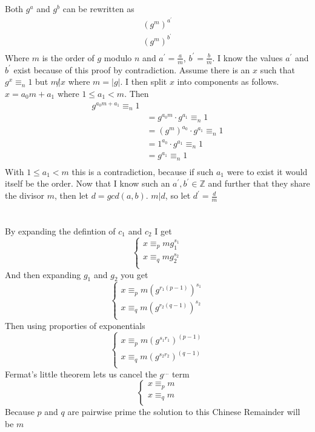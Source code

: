\documentclass{article}
\begin{document}
\section{}
Both $g^{a}$ and $g^{b}$ can be rewritten as 
\[
\begin{split}
(g^{m})^{a^{\prime}} \\
(g^{m})^{b^{\prime}} \\
\end{split}
\]
Where $m$ is the order of $g$ modulo $n$ and
$a^{\prime} = \frac{a}{m}$, 
$b^{\prime} = \frac{b}{m}$.
\newline
I know the values $a^{\prime}$ and $b^{\prime}$ exist because of this proof by contradiction.
\newline
Assume there is an $x$ such that $g^{x} \equiv_{n} 1$ but $m \not| x$ where $m = |g|$.
I then split $x$ into components as follows. $x = a_{0}m + a_{1}$ where $1 \le a_{1} < m$. Then
\[
\begin{split}
g^{a_{0}m + a_{1}} \equiv_{n} 1 & \\
&= g^{a_{0}m} \cdot g^{a_{1}} \equiv_{n} 1\\
&= (g^{m})^{a_{0}} \cdot g^{a_{1}} \equiv_{n} 1\\
&= 1^{a_{0}} \cdot g^{a_{1}} \equiv_{n} 1\\
&= g^{a_{1}} \equiv_{n} 1\\
\end{split}
\]
With $1 \le a_{1} < m$ this is a contradiction, because if such $a_{1}$ were to exist it would itself be the order.
\newline
Now that I know such an $a^{\prime}, b^{\prime} \in \mathbb{Z}$ and further that they share the divisor $m$,
then let $d = gcd(a, b)$. $m|d$, so let $d^{\prime} = \frac{d}{m}$ 


\section{}
By expanding the defintion of $c_{1}$ and $c_{2}$ I get
\[
\begin{cases}
x \equiv_{p} mg_{1}^{s_{1}} \\
x \equiv_{q} mg_{2}^{s_{2}} \\
\end{cases}
\]
And then expanding $g_{1}$ and $g_{2}$ you get
\[
\begin{cases}
x \equiv_{p} m(g^{r_{1}(p-1)})^{s_{1}} \\
x \equiv_{q} m(g^{r_{2}(q-1)})^{s_{2}} \\
\end{cases}
\]
Then using proporties of exponentials
\[
\begin{cases}
x \equiv_{p} m(g^{s_{1}r_{1}})^{(p-1)} \\
x \equiv_{q} m(g^{s_{2}r_{2}})^{(q-1)} \\
\end{cases}
\]
Fermat's little theorem lets us cancel the $g^{...}$ term
\[
\begin{cases}
x \equiv_{p} m \\
x \equiv_{q} m \\
\end{cases}
\]
Because $p$ and $q$ are pairwise prime the solution to this Chinese Remainder will be $m$
\end{document}
